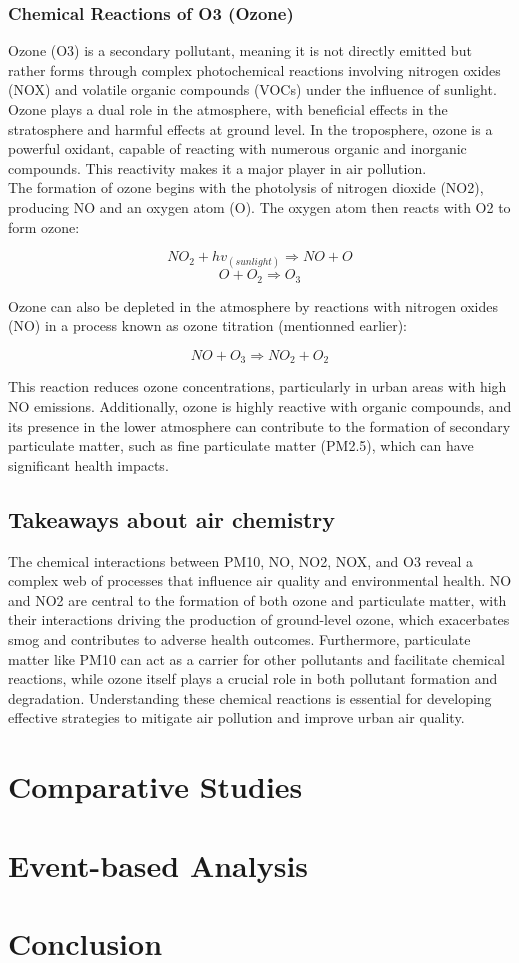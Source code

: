\documentclass{modeleRapport}
\begin{document}
\subsubsection{Chemical Reactions of O3 (Ozone)}

Ozone (O3) is a secondary pollutant, meaning it is not directly emitted but rather forms through complex photochemical 
reactions involving nitrogen oxides (NOX) and volatile organic compounds (VOCs) under the influence of sunlight. Ozone 
plays a dual role in the atmosphere, with beneficial effects in the stratosphere and harmful effects at ground level. In the 
troposphere, ozone is a powerful oxidant, capable of reacting with numerous organic and inorganic compounds. This reactivity 
makes it a major player in air pollution.\\

The formation of ozone begins with the photolysis of nitrogen dioxide (NO2), producing NO and an oxygen atom (O). The 
oxygen atom then reacts with O2 to form ozone:

$$NO_2 + hv_{(sunlight)} \Rightarrow NO+O$$
$$O+O_2 \Rightarrow O_3$$

Ozone can also be depleted in the atmosphere by reactions with nitrogen oxides (NO) in a process known as ozone titration
(mentionned earlier):

$$NO + O_3 \Rightarrow NO_2 + O_2$$

This reaction reduces ozone concentrations, particularly in urban areas with high NO emissions. Additionally, ozone is 
highly reactive with organic compounds, and its presence in the lower atmosphere can contribute to the formation of 
secondary particulate matter, such as fine particulate matter (PM2.5), which can have significant health impacts.

\subsection{Takeaways about air chemistry}

The chemical interactions between PM10, NO, NO2, NOX, and O3 reveal a complex web of processes that influence air 
quality and environmental health. NO and NO2 are central to the formation of both ozone and particulate matter, with their 
interactions driving the production of ground-level ozone, which exacerbates smog and contributes to adverse health outcomes. 
Furthermore, particulate matter like PM10 can act as a carrier for other pollutants and facilitate chemical reactions, while 
ozone itself plays a crucial role in both pollutant formation and degradation. Understanding these chemical reactions is 
essential for developing effective strategies to mitigate air pollution and improve urban air quality.

\section{Comparative Studies}



\section{Event-based Analysis}



\section{Conclusion}
\end{document}
